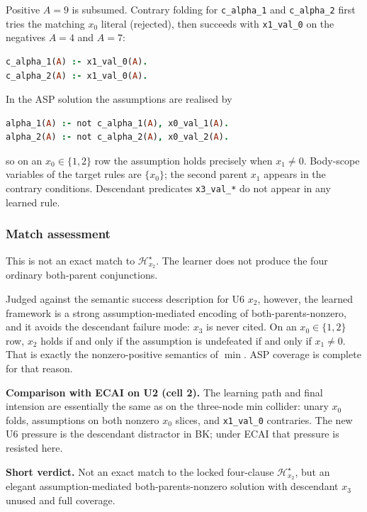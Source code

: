 \documentclass[11pt]{article}
\begin{document}
Positive \(A=9\) is subsumed. Contrary folding for \texttt{c\_alpha\_1} and \texttt{c\_alpha\_2} first tries the matching \(x_0\) literal (rejected), then succeeds with \texttt{x1\_val\_0} on the negatives \(A=4\) and \(A=7\):

\begin{lstlisting}[style=logic,language=Prolog]
c_alpha_1(A) :- x1_val_0(A).
c_alpha_2(A) :- x1_val_0(A).
\end{lstlisting}

In the ASP solution the assumptions are realised by

\begin{lstlisting}[style=logic,language=Prolog]
alpha_1(A) :- not c_alpha_1(A), x0_val_1(A).
alpha_2(A) :- not c_alpha_2(A), x0_val_2(A).
\end{lstlisting}

so on an \(x_0\in\{1,2\}\) row the assumption holds precisely when \(x_1\neq 0\). Body-scope variables of the target rules are \(\{x_0\}\); the second parent \(x_1\) appears in the contrary conditions. Descendant predicates \texttt{x3\_val\_*} do not appear in any learned rule.

\subsubsection{Match assessment}

This is not an exact match to \(\mathcal{H}_{x_2}^\star\). The learner does not produce the four ordinary both-parent conjunctions.

Judged against the semantic success description for U6 \(x_2\), however, the learned framework is a strong assumption-mediated encoding of both-parents-nonzero, and it avoids the descendant failure mode: \(x_3\) is never cited. On an \(x_0\in\{1,2\}\) row, \(x_2\) holds if and only if the assumption is undefeated if and only if \(x_1\neq 0\). That is exactly the nonzero-positive semantics of \(\min\). ASP coverage is complete for that reason.

\textbf{Comparison with ECAI on U2 (cell 2).} The learning path and final intension are essentially the same as on the three-node min collider: unary \(x_0\) folds, assumptions on both nonzero \(x_0\) slices, and \texttt{x1\_val\_0} contraries. The new U6 pressure is the descendant distractor in BK; under ECAI that pressure is resisted here.

\textbf{Short verdict.} Not an exact match to the locked four-clause \(\mathcal{H}_{x_2}^\star\), but an elegant assumption-mediated both-parents-nonzero solution with descendant \(x_3\) unused and full coverage.
\end{document}
